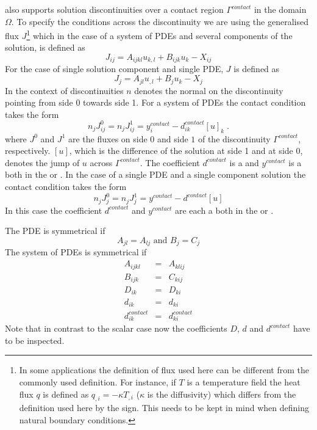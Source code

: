 \LinearPDE also supports solution discontinuities over a
contact region $\Gamma^{contact}$ in the domain $\Omega$.
To specify the conditions across the discontinuity we are using the
generalised flux $J$\footnote{In some applications the definition of flux used
here can be different from the commonly used definition.
For instance, if $T$ is a temperature field the heat flux $q$ is defined as
$q_{,i}=-\kappa T_{,i}$ ($\kappa$ is the diffusivity) which differs from the
definition used here by the sign. This needs to be kept in mind when defining
natural boundary conditions.} which in
the case of a system of PDEs and several components of the solution, is
defined as
\begin{equation}\label{LINEARPDE.SYSTEM.5}
J_{ij}=A_{ijkl}u_{k,l}+B_{ijk}u_{k}-X_{ij}
\end{equation}
For the case of single solution component and single PDE, $J$ is defined as
\begin{equation}\label{LINEARPDE.SINGLE.5}
J_{j}=A_{jl}u_{,l}+B_{j}u_{k}-X_{j}
\end{equation}
In the context of discontinuities $n$ denotes the normal
on the discontinuity pointing from side 0 towards side 1.
For a system of PDEs the contact condition takes the form
\begin{equation}\label{LINEARPDE.SYSTEM.6}
n_{j} J^{0}_{ij}=n_{j} J^{1}_{ij}=y^{contact}_{i} - d^{contact}_{ik} [u]_{k} \; .
\end{equation}
where $J^{0}$ and $J^{1}$ are the fluxes on side $0$ and side $1$ of the
discontinuity $\Gamma^{contact}$, respectively. $[u]$, which is the difference
of the solution at side 1 and at side 0, denotes the jump of $u$ across $\Gamma^{contact}$.
The coefficient $d^{contact}$ is a \RankTwo and $y^{contact}$ is a
\RankOne both in the \FunctionOnContactZero or \FunctionOnContactOne.
In the case of a single PDE and a single component solution the contact
condition takes the form
\begin{equation}\label{LINEARPDE.SINGLE.6}
n_{j} J^{0}_{j}=n_{j} J^{1}_{j}=y^{contact} - d^{contact}[u]
\end{equation}
In this case the coefficient $d^{contact}$ and $y^{contact}$ are each a
\Scalar both in the \FunctionOnContactZero or \FunctionOnContactOne.

The PDE is symmetrical if
\begin{equation}\label{LINEARPDE.SINGLE.4}
A_{jl}=A_{lj} \mbox{ and } B_{j}=C_{j}
\end{equation}
The system of PDEs is symmetrical if
\begin{eqnarray}
\label{LINEARPDE.SYSTEM.4}
A_{ijkl}&=&A_{klij} \\
B_{ijk}&=&C_{kij} \\
D_{ik}&=&D_{ki} \\
d_{ik}&=&d_{ki} \\
d^{contact}_{ik}&=&d^{contact}_{ki}
\end{eqnarray}
Note that in contrast to the scalar case  now the
coefficients $D$, $d$ and $d^{contact}$ have to be inspected.

